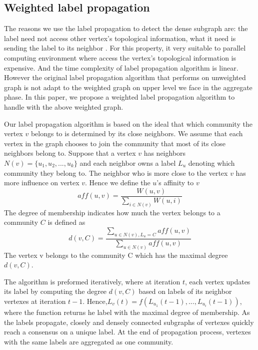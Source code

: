 \documentclass{acm_proc_article-sp}
\begin{document}
\subsection{Weighted label propagation}
The reasons we use the label propagation to detect the dense subgraph are: the label need not access other vertex's topological information, what it need is sending the label to its neighbor \cite{Raghavan2007Near}. For this property, it very suitable to parallel computing environment where access the vertex's topological information is expensive. And the time complexity of label propagation algorithm is linear. However the original label propagation algorithm that performs on unweighted graph is not adapt to the weighted graph on upper level we face in the aggregate phase. In this paper, we propose a weighted label propagation algorithm to handle with the above weighted graph.
\par
Our label propagation algorithm is based on the ideal that which community the vertex $v$ belongs to is determined by its close neighbors. We assume that each vertex in the graph chooses to join the community that most of its close neighbors belong to. Suppose that a vertex $v$ has neighbors $N(v)=\{u_{1},u_{2},...,u_{k}\}$ and each neighbor owns a label $L_{u}$ denoting which community they belong to. The neighbor who is more close to the vertex $v$ has more influence on vertex $v$. Hence we define the $u$'s affinity to $v$
\begin{displaymath}
aff(u,v)=\frac{W(u,v)}{\sum_{i\in N(v)}W(u,i)}
\end{displaymath}
The degree of membership indicates how much the vertex belongs to a community $C$ is defined as
\begin{displaymath}
d(v,C)=\frac{\sum_{u\in N(v),L_{u}=C}aff(u,v)}{\sum_{u\in N(v)}aff(u,v)}
\end{displaymath}
The vertex v belongs to the community C which has the maximal degree $d(v,C)$.
\par
The algorithm is preformed iteratively, where at iteration $t$, each vertex updates its label by computing the degree $d(v,C)$ based on labels of its neighbor vertexes at iteration $t-1$. Hence,$L_{v}(t)=f(L_{u_{1}}(t-1),...,L_{u_{i}}(t-1))$, where the function returns he label with the maximal degree of membership. As the labels propagate, closely and densely connected subgraphs of vertexes quickly reach a consensus on a unique label. At the end of propagation process, vertexes with the same labels are aggregated as one community.
\par
\end{document}
